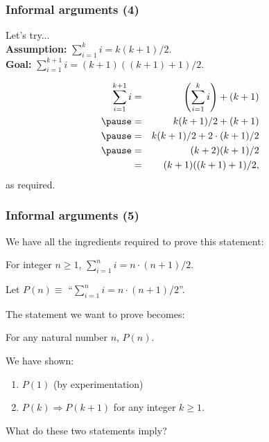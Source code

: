 \begin{frame}\frametitle{Informal arguments (4)}
  Let's try... \\
  {\bf Assumption:} $\sum_{i=1}^k i = k(k+1)/2$. \\
  {\bf Goal:} $\sum_{i=1}^{k+1} i = (k+1)((k+1)+1)/2$. \\ \pause

  \begin{eqnarray*}
    \sum_{i=1}^{k+1} i &=& \left(\sum_{i=1}^k i\right) + (k+1) \\ \pause
    &=& k(k+1)/2 + (k+1) \\ \pause
    &=& k(k+1)/2 + 2\cdot(k+1)/2 \\ \pause
    &=& (k+2)(k+1)/2\\
    &=& (k+1)((k+1)+1)/2,
  \end{eqnarray*}
  as required.

\end{frame}

\begin{frame}\frametitle{Informal arguments (5)}
  We have all the ingredients required to prove this statement:
  \begin{tcolorbox}
    For integer $n\geq 1$, $\sum_{i=1}^n i = n\cdot(n+1)/2.$
  \end{tcolorbox}
  \pause

  Let $P(n)\equiv$ ``$\sum_{i=1}^n i = n\cdot(n+1)/2$''. \pause

  The statement we want to prove becomes:

  \begin{tcolorbox}
    For any natural number $n$, $P(n)$.
  \end{tcolorbox}
  \pause

  We have shown:
  \begin{enumerate}
  \item $P(1)$ (by experimentation)
  \item $P(k)\Rightarrow P(k+1)$ for any integer $k\geq 1$.
  \end{enumerate}
  \pause

  What do these two statements imply?
  
\end{frame}

